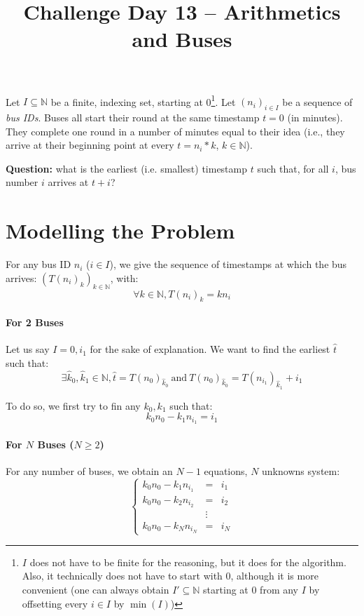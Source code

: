 \documentclass{article}
\title{Challenge Day 13 -- Arithmetics and Buses}
\author{}
\date{}
\begin{document}
\maketitle

Let $I \subseteq \mathbb{N}$ be a finite, indexing set, starting at 0\footnote{$I$ does not have to be finite for the reasoning, but it does for the algorithm. Also, it technically does not have to start with 0, although it is more convenient (one can always obtain $I' \subseteq \mathbb{N}$ starting at 0 from any $I$ by offsetting every $i \in I$ by $\min(I)$)}. Let $(n_i)_{i\in I}$ be a sequence of \textit{bus IDs}. Buses all start their round at the same timestamp $t = 0$ (in minutes). They complete one round in a number of minutes equal to their idea (i.e., they arrive at their beginning point at every $t = n_i * k$, $k \in \mathbb{N}$).

\medskip

\noindent\textbf{Question:} what is the earliest (i.e. smallest) timestamp $t$ such that, for all $i$, bus number $i$ arrives at $t + i$?


\section{Modelling the Problem}

For any bus ID $n_i$ ($i \in I$), we give the sequence of timestamps at which the bus arrives: $(T(n_i)_k)_{k \in \mathbb{N}}$, with:
$$\forall k \in \mathbb{N}, T(n_i)_k = k n_i$$

\paragraph{For 2 Buses} Let us say $I = {0, i_1}$ for the sake of explanation. We want to find the earliest $\hat t$ such that:
$$\exists \hat k_0, \hat k_1 \in \mathbb{N}, \hat t = T(n_0)_{\hat k_0} \ \mathrm{and}\ T(n_0)_{\hat k_0} = T(n_{i_1})_{\hat k_1} + i_1$$

To do so, we first try to fin any $k_0, k_1$ such that:
\begin{equation}\label{eqn:2buses}
k_0 n_0 - k_1 n_{i_1} = i_1
\end{equation}

\paragraph{For $N$ Buses ($N \geq 2$)} For any number of buses, we obtain an $N-1$ equations, $N$ unknowns system:
\begin{equation}\label{eqn:nbuses}
\left\{\begin{array}{lcl}
k_0 n_0 - k_1 n_{i_1} & = & i_1 \\
k_0 n_0 - k_2 n_{i_2} & = & i_2 \\
& \vdots & \\
k_0 n_0 - k_N n_{i_N} & = & i_N
\end{array}\right.
\end{equation}
\end{document}
